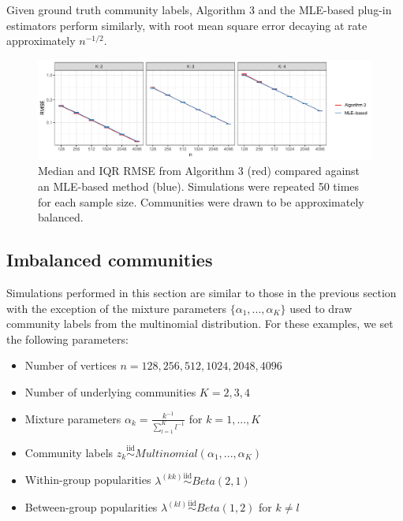 \documentclass[12pt]{article}
\providecommand{\tightlist}{%
  \setlength{\itemsep}{0pt}\setlength{\parskip}{0pt}}
\begin{document}
Given ground truth community labels, Algorithm 3 and the MLE-based
plug-in estimators \cite{307cbeb9b1be48299388437423d94bf1}
\cite{noroozi2019estimation} perform similarly, with root mean square
error decaying at rate approximately \(n^{-1/2}\).

\begin{figure}[H]

{\centering \includegraphics{summary_files/figure-latex/lambda_est_k-1}

}

\caption{Median and IQR RMSE from Algorithm 3 (red) compared against an MLE-based method (blue). Simulations were repeated 50 times for each sample size. Communities were drawn to be approximately balanced.}\label{fig:lambda_est_k}
\end{figure}

\hypertarget{imbalanced-communities}{%
\subsection{Imbalanced communities}\label{imbalanced-communities}}

Simulations performed in this section are similar to those in the
previous section with the exception of the mixture parameters
\(\{\alpha_1, ..., \alpha_K\}\) used to draw community labels from the
multinomial distribution. For these examples, we set the following
parameters:

\begin{itemize}
\tightlist
\item
  Number of vertices \(n = 128, 256, 512, 1024, 2048, 4096\)
\item
  Number of underlying communities \(K = 2, 3, 4\)
\item
  Mixture parameters \(\alpha_k = \frac{k^{-1}}{\sum_{l=1}^K l^{-1}}\)
  for \(k = 1, ..., K\)
\item
  Community labels
  \(z_k \stackrel{\text{iid}}{\sim}Multinomial(\alpha_1, ..., \alpha_K)\)
\item
  Within-group popularities
  \(\lambda^{(kk)} \stackrel{\text{iid}}{\sim}Beta(2, 1)\)
\item
  Between-group popularities
  \(\lambda^{(kl)} \stackrel{\text{iid}}{\sim}Beta(1, 2)\) for
  \(k \neq l\)
\end{itemize}
\end{document}
